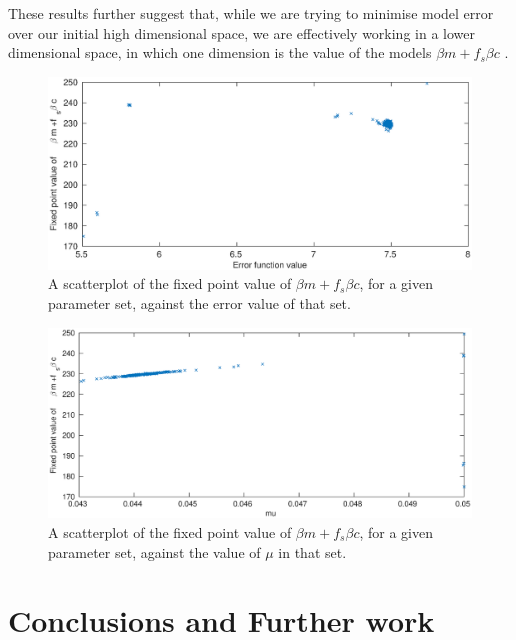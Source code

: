 \documentclass[10pt,journal]{./IEEE_latex_class/IEEEtran}
\begin{document}
These results further suggest that, while we are trying to minimise model error over our initial high dimensional space, we are effectively working in a lower dimensional space, in which one dimension is the value of the models $\beta m +f_{s}\beta c$ .


\begin{figure}[h]	
    \centering
        \includegraphics[scale = 0.25]{fixedpoint_f}
        \caption{A scatterplot of the fixed point value of $\beta m +f_{s}\beta c$, for a given parameter set, against the error value of that set. }
        \label{fixedpoint_f} 
\end{figure}

\begin{figure}[h]	
    \centering
        \includegraphics[scale = 0.25]{fixedpoint_mu}
        \caption{A scatterplot of the fixed point value of $\beta m +f_{s}\beta c$, for a given parameter set, against the value of $\mu$ in that set.}
        \label{fixedpoint_mu} 
\end{figure} 


 
 
\section{Conclusions and Further work}
\label{Conclusions and Further work}
\end{document}
